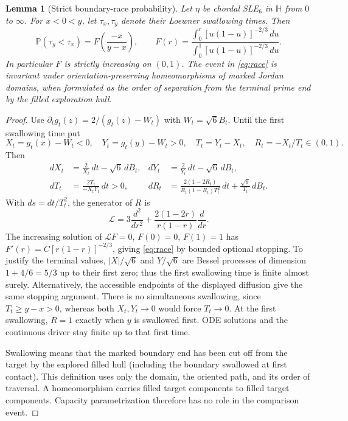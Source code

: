 \documentclass[11pt]{article}
\newtheorem{lemma}[theorem]{Lemma}
\theoremstyle{definition}\newtheorem{definition}[theorem]{Definition}
\theoremstyle{remark}\newtheorem{remark}[theorem]{Remark}
\newcommand{\HH}{\mathbb H}
\begin{document}
\begin{lemma}[Strict boundary-race probability]
\label{lem:race}
Let $\eta$ be chordal SLE$_6$ in $\HH$ from $0$ to $\infty$. For
$x<0<y$, let $\tau_x,\tau_y$ denote their Loewner swallowing times. Then
\begin{equation}
 \mathbb P(\tau_y<\tau_x)=F\left(\frac{-x}{y-x}\right),\qquad
 F(r)=\frac{\int_0^r[u(1-u)]^{-2/3}\,du}
 {\int_0^1[u(1-u)]^{-2/3}\,du}.
 \label{eq:race}
\end{equation}
In particular $F$ is strictly increasing on $(0,1)$. The event in
\eqref{eq:race} is invariant under orientation-preserving homeomorphisms of
marked Jordan domains, when formulated as the order of separation from
the terminal prime end by the filled exploration hull.
\end{lemma}

\begin{proof}
Use $\partial_tg_t(z)=2/(g_t(z)-W_t)$ with $W_t=\sqrt6 B_t$. Until the
first swallowing time put
\[
 X_t=g_t(x)-W_t<0,\quad Y_t=g_t(y)-W_t>0,\quad
 T_t=Y_t-X_t,\quad R_t=-X_t/T_t\in(0,1).
\]
Then
\begin{align*}
 dX_t&=\frac{2}{X_t}\,dt-\sqrt6\,dB_t,&
 dY_t&=\frac{2}{Y_t}\,dt-\sqrt6\,dB_t,\\
 dT_t&=\frac{2T_t}{-X_tY_t}\,dt>0,&
 dR_t&=\frac{2(1-2R_t)}{R_t(1-R_t)T_t^2}\,dt
                 +\frac{\sqrt6}{T_t}\,dB_t.
\end{align*}
With $ds=dt/T_t^2$, the generator of $R$ is
\[
 \mathcal L=3\frac{d^2}{dr^2}
       +\frac{2(1-2r)}{r(1-r)}\frac d{dr}.
\]
The increasing solution of $\mathcal LF=0$, $F(0)=0$, $F(1)=1$ has
$F'(r)=C[r(1-r)]^{-2/3}$, giving \eqref{eq:race} by bounded optional
stopping. To justify the terminal values, $|X|/\sqrt6$ and $Y/\sqrt6$
are Bessel processes of dimension $1+4/6=5/3$ up to their first zero;
thus the first swallowing time is finite almost surely. Alternatively,
the accessible endpoints of the displayed diffusion give the same stopping
argument. There is no simultaneous swallowing, since $T_t\geq y-x>0$,
whereas both $X_t,Y_t\to0$ would force $T_t\to0$. At the first swallowing,
$R=1$ exactly when $y$ is swallowed first. ODE solutions and the continuous
driver stay finite up to that first time.

Swallowing means that the marked boundary end has been cut off from the
target by the explored filled hull (including the boundary swallowed at
first contact). This definition uses only the domain, the oriented path,
and its order of traversal. A homeomorphism carries filled target
components to filled target components. Capacity parametrization therefore
has no role in the comparison event.
\end{proof}
\end{document}
